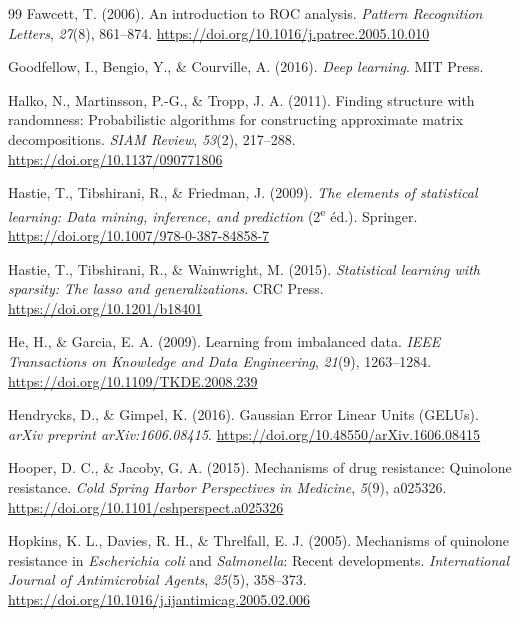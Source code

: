 \documentclass[11pt,a4paper]{article}
\begin{document}
\begin{thebibliography}{99}
Fawcett, T. (2006). An introduction to ROC analysis. \textit{Pattern Recognition Letters}, \textit{27}(8), 861--874. \url{https://doi.org/10.1016/j.patrec.2005.10.010}

Goodfellow, I., Bengio, Y., \& Courville, A. (2016). \textit{Deep learning}. MIT Press.

Halko, N., Martinsson, P.-G., \& Tropp, J. A. (2011). Finding structure with randomness: Probabilistic algorithms for constructing approximate matrix decompositions. \textit{SIAM Review}, \textit{53}(2), 217--288. \url{https://doi.org/10.1137/090771806}

Hastie, T., Tibshirani, R., \& Friedman, J. (2009). \textit{The elements of statistical learning: Data mining, inference, and prediction} (2\textsuperscript{e} éd.). Springer. \url{https://doi.org/10.1007/978-0-387-84858-7}

Hastie, T., Tibshirani, R., \& Wainwright, M. (2015). \textit{Statistical learning with sparsity: The lasso and generalizations}. CRC Press. \url{https://doi.org/10.1201/b18401}

He, H., \& Garcia, E. A. (2009). Learning from imbalanced data. \textit{IEEE Transactions on Knowledge and Data Engineering}, \textit{21}(9), 1263--1284. \url{https://doi.org/10.1109/TKDE.2008.239}

Hendrycks, D., \& Gimpel, K. (2016). Gaussian Error Linear Units (GELUs). \textit{arXiv preprint arXiv:1606.08415}. \url{https://doi.org/10.48550/arXiv.1606.08415}

Hooper, D. C., \& Jacoby, G. A. (2015). Mechanisms of drug resistance: Quinolone resistance. \textit{Cold Spring Harbor Perspectives in Medicine}, \textit{5}(9), a025326. \url{https://doi.org/10.1101/cshperspect.a025326}

Hopkins, K. L., Davies, R. H., \& Threlfall, E. J. (2005). Mechanisms of quinolone resistance in \textit{Escherichia coli} and \textit{Salmonella}: Recent developments. \textit{International Journal of Antimicrobial Agents}, \textit{25}(5), 358--373. \url{https://doi.org/10.1016/j.ijantimicag.2005.02.006}


\end{thebibliography}
\end{document}
